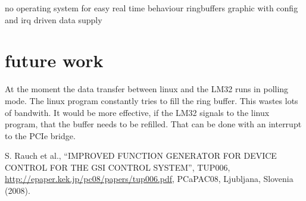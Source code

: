 \documentclass[a4paper,
              ]{jacow}
\begin{document}
no operating system for easy real time behaviour
ringbuffers
graphic with config and irq driven data supply
\section{future work}
At the moment the data transfer between linux and the LM32 runs in polling mode. The linux program constantly tries to fill the ring buffer. This wastes lots of bandwith. It would be more effective, if the LM32 signals to the linux program, that the buffer needs to be refilled. That can be done with an interrupt to the PCIe bridge.


%
%
\iftrue   %
	\newpage
	\raggedend
\fi


\iffalse  %
	\newpage
	\printbibliography

\else
\begin{thebibliography}{9}   %

    S. Rauch et al., ``IMPROVED FUNCTION GENERATOR FOR
	 DEVICE CONTROL FOR THE GSI CONTROL SYSTEM'',
    TUP006, \url{http://epaper.kek.jp/pc08/papers/tup006.pdf}, PCaPAC08, Ljubljana, Slovenia (2008).

\end{thebibliography}
\fi
\end{document}
